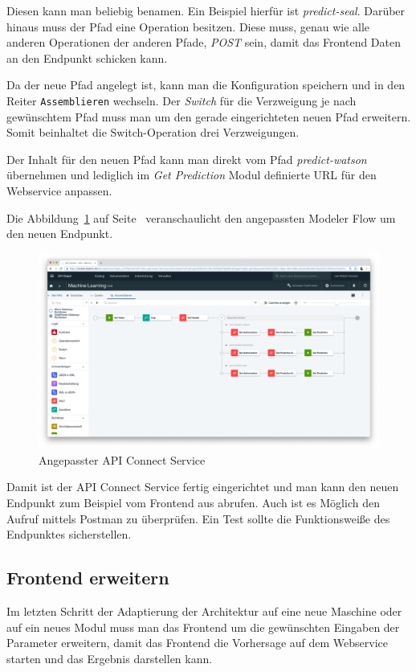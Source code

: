Diesen kann man beliebig benamen. Ein Beispiel hierfür ist \textit{predict-seal}. Darüber hinaus muss der Pfad eine
Operation besitzen. Diese muss, genau wie alle anderen Operationen der anderen Pfade, \textit{POST} sein, damit das
Frontend Daten an den Endpunkt schicken kann.

Da der neue Pfad angelegt ist, kann man die Konfiguration speichern und in den Reiter \texttt{Assemblieren} wechseln.
Der \textit{Switch} für die Verzweigung je nach gewünschtem Pfad muss man um den gerade eingerichteten neuen Pfad
erweitern. Somit beinhaltet die Switch-Operation drei Verzweigungen.

Der Inhalt für den neuen Pfad kann man direkt vom Pfad \textit{predict-watson} übernehmen und lediglich im
\textit{Get Prediction} Modul definierte URL für den Webservice anpassen.

Die Abbildung~\ref{fig:siegelmaschinen_apiconnect} auf Seite~\pageref{fig:siegelmaschinen_apiconnect} veranschaulicht
den angepassten Modeler Flow um den neuen Endpunkt.

\begin{figure}[h]
    \centering
    \includegraphics[width=\textwidth]{images/kapitel_5/vffs_apiconnect.png}
    \caption{Angepasster API Connect Service}
    \label{fig:siegelmaschinen_apiconnect}
\end{figure}

Damit ist der API Connect Service fertig eingerichtet und man kann den neuen Endpunkt zum Beispiel vom Frontend aus
abrufen. Auch ist es Möglich den Aufruf mittels Postman zu überprüfen. Ein Test sollte die Funktionsweiße des Endpunktes
sicherstellen.

\subsection{Frontend erweitern}
Im letzten Schritt der Adaptierung der Architektur auf eine neue Maschine oder auf ein neues Modul muss man das Frontend
um die gewünschten Eingaben der Parameter erweitern, damit das Frontend die Vorhersage auf dem Webservice starten und
das Ergebnis darstellen kann.

